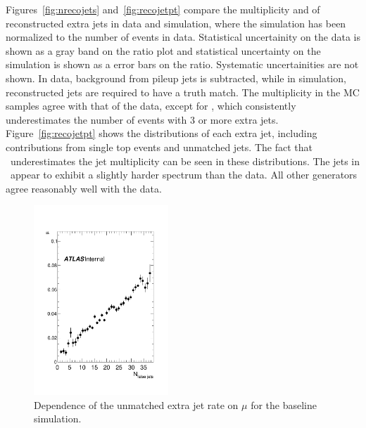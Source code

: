 Figures~\ref{fig:nrecojets} and~\ref{fig:recojetpt} compare the multiplicity and \pt of reconstructed extra jets in data and \ttbar simulation, where the simulation has been normalized to the number of events in data. Statistical uncertainity on the data is shown as a gray band on the ratio plot and statistical uncertainty on the simulation is shown as a error bars on the ratio.  Systematic uncertainities are not shown. 
In data, background from pileup jets is subtracted, while in simulation, reconstructed jets are required to have a truth match. The multiplicity 
in the MC samples agree with that of the data, except for \mcnlohw, which consistently underestimates the number of events with 3 or more extra jets. Figure~\ref{fig:recojetpt} shows the \pt distributions of each extra jet, including contributions from single top events and unmatched jets. 
The fact that \mcnlohw\ underestimates the jet multiplicity can be seen in these distributions. The jets in \peight\ appear to exhibit a slightly harder spectrum than the data. All other generators agree reasonably well with the data. 
\begin{figure}
\centering
\includegraphics[width=0.45\textwidth]{fig/MCComp/FalseVsMu.pdf}
\caption{Dependence of the unmatched extra jet rate on $\mu$ for the baseline simulation.}
\label{fig:falsecomp}
\end{figure}

